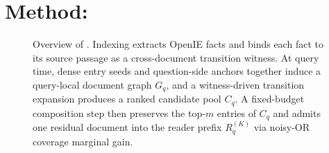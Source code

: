 %
%
%

\section{Method: \methodname{}}
\label{sec:method}

\begin{figure}[t]
\centering
{}
\caption{Overview of \methodname{}. Indexing extracts OpenIE facts and
binds each fact to its source passage as a cross-document transition
witness. At query time, dense entry seeds and question-side anchors
together induce a query-local document graph $G_q$, and a witness-driven
transition expansion produces a ranked candidate pool $C_q$. A
fixed-budget composition step then preserves the top-$m$ entries of
$C_q$ and admits one residual document into the reader prefix
$R_q^{(K)}$ via noisy-OR coverage marginal gain.}
\label{fig:overview}
\end{figure}

